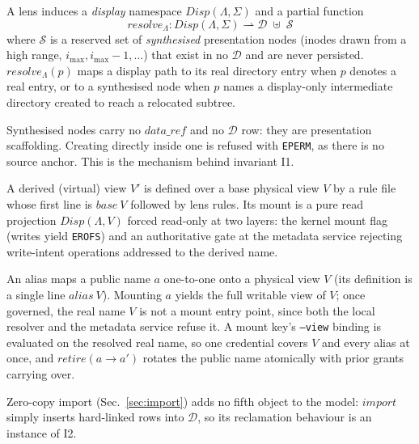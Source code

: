 \documentclass[numberedsection,acmtos]{acmart}
\begin{document}
\begin{definition}\label{def:resolve}
A lens induces a \emph{display} namespace $\mathit{Disp}(\Lambda,\Sigma)$ and a
partial function
\[
  \mathit{resolve}_\Lambda : \mathit{Disp}(\Lambda,\Sigma) \rightharpoonup
  \mathcal{D} \;\uplus\; \mathcal{S}
\]
where $\mathcal{S}$ is a reserved set of \emph{synthesised} presentation nodes
(inodes drawn from a high range, $i_{\max}, i_{\max}{-}1, \dots$) that exist in
no $\mathcal{D}$ and are never persisted. $\mathit{resolve}_\Lambda(p)$ maps a
display path to its real directory entry when $p$ denotes a real entry, or to a
synthesised node when $p$ names a display-only intermediate directory created to
reach a relocated subtree.
\end{definition}

Synthesised nodes carry no $\mathit{data\_ref}$ and no $\mathcal{D}$ row: they
are presentation scaffolding. Creating directly inside one is refused with
\texttt{EPERM}, as there is no source anchor. This is the mechanism behind
invariant I1.

\begin{definition}
\label{def:derived}
A derived (virtual) view $V'$ is defined over a base physical view $V$ by a rule
file whose first line is $\mathit{base}\ V$ followed by lens rules. Its mount is
a pure read projection $\mathit{Disp}(\Lambda, V)$ forced read-only at two
layers: the kernel mount flag (writes yield \texttt{EROFS}) and an authoritative
gate at the metadata service rejecting write-intent operations addressed to the
derived name.
\end{definition}

\begin{definition}\label{def:alias}
An alias maps a public name $a$ one-to-one onto a physical view $V$ (its
definition is a single line $\mathit{alias}\ V$). Mounting $a$ yields the full
writable view of $V$; once governed, the real name $V$ is not a mount entry
point, since both the local resolver and the metadata service refuse it.
A mount key's \texttt{--view} binding is evaluated on the resolved real name, so
one credential covers $V$ and every alias at once, and $\mathit{retire}(a\!\to\!a')$ rotates the public
name atomically with prior grants carrying over.
\end{definition}

Zero-copy import (Sec.~\ref{sec:import}) adds no fifth object to the model:
$\mathit{import}$ simply inserts hard-linked rows into $\mathcal{D}$, so its
reclamation behaviour is an instance of I2.
\end{document}
